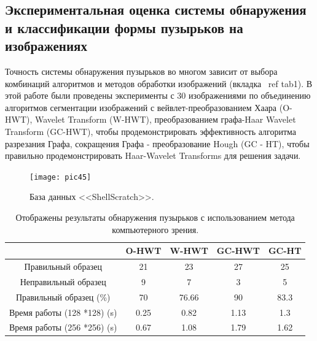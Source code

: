 \documentclass[a4paper,14pt]{extreport}
\begin{document}
\subsection{Экспериментальная оценка системы обнаружения и классификации формы пузырьков на изображениях}
Точность системы обнаружения пузырьков во многом зависит от выбора комбинаций алгоритмов и методов обработки изображений (вкладка \ ref {tab1}). В этой работе были проведены эксперименты с 30 изображениями по объединению алгоритмов сегментации изображений с вейвлет-преобразованием Хаара (O-HWT), Wavelet Transform (W-HWT), преобразованием графа-Haar Wavelet Transform (GC-HWT), чтобы продемонстрировать эффективность алгоритма разрезания Графа, сокращения Графа - преобразование Hough (GC - HT), чтобы правильно продемонстрировать Haar-Wavelet Transforms для решения задачи.
\begin{figure}[ht!]
\centering
\texttt{[image: pic45]}
\caption{База данных <<ShellScratch>>.}
	\label{pic45}
		\end{figure}
 \begin{table}[h!]%
\centering
\caption{Отображены результаты обнаружения пузырьков с использованием метода компьютерного зрения.}
\label{tab1}
  \begin{tabular}{|c|c|c|c|c|}
    \hline
                            &O-HWT & W-HWT&GC-HWT&GC-HT  \\
    \hline
Правильный образец                      &21	&23	&27	&25\\
\hline 
Неправильный образец                       &9   &7  &3  &5\\
\hline 
Правильный образец (\%)                 &70  &76.66 &90 &83.3\\
\hline 
Время работы (128 *128) (s) &0.25	&0.82	&1.13	&1.3 \\
\hline 
Время работы (256 *256) (s) &0.67	&1.08	&1.79	&1.62 \\
\hline
  \end{tabular}
\end{table}%
%
%
\end{document}
